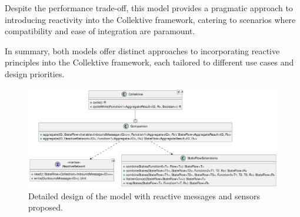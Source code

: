 Despite the performance trade-off, this model provides a pragmatic approach to introducing reactivity into the Collektive framework, catering to scenarios where compatibility and ease of integration are paramount.

In summary, both models offer distinct approaches to incorporating reactive principles into the Collektive framework, each tailored to different use cases and design priorities.

\begin{figure}
    \centering
    \includegraphics[width=\linewidth]{figures/collektive-rmsm-design.pdf}
    \caption{Detailed design of the model with reactive messages and sensors proposed.}
    \label{fig:collektive-rmsm-design}
\end{figure}
